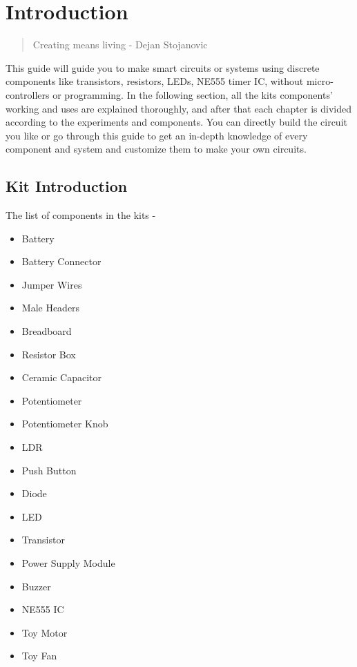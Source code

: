 \cleardoublepage
{} %

\chapter{Introduction}

\begin{quote}
    {\Large Creating means living} - Dejan Stojanovic
\end{quote}
This guide will guide you to make smart circuits or systems using discrete components like transistors, resistors, LEDs, NE555 timer IC, without micro-controllers or programming.
In the following section, all the kits components' working and uses are explained thoroughly, and after that each chapter is divided according to the experiments and components. You can directly build the circuit you like or go through this guide to get an in-depth knowledge of every component and system and customize them to make your own circuits.

\section{Kit Introduction}
The list of components in the kits - 
\begin{itemize}
\item Battery
\item Battery Connector
\item Jumper Wires
\item Male Headers
\item Breadboard
\item Resistor Box
\item Ceramic Capacitor
\item Potentiometer
\item Potentiometer Knob
\item LDR
\item Push Button
\item Diode
\item LED
\item Transistor
\item Power Supply Module
\item Buzzer
\item NE555 IC
\item Toy Motor
\item Toy Fan
\end{itemize}